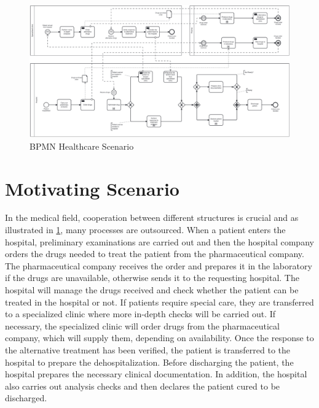 
\begin{figure}[t]
\centering
\includegraphics[width=10 cm]{content/figures/healthcare_scenario.pdf}
\caption{BPMN Healthcare Scenario}
\label{fig:BPMN_Healthcare}
\end{figure}
\section{Motivating Scenario}\label{sec:motivating}
In the medical field, cooperation between different structures is crucial and as illustrated in \cref{fig:BPMN_Healthcare}, many processes are outsourced. 
When a patient enters the hospital, preliminary examinations are carried out and then the hospital company orders the drugs needed to treat the patient from the pharmaceutical company. The pharmaceutical company receives the order and prepares it in the laboratory if the drugs are unavailable, otherwise sends it to the requesting hospital. The hospital will manage the drugs received and check whether the patient can be treated in the hospital or not. If patients require special care, they are transferred to a specialized clinic where more in-depth checks will be carried out. If necessary, the specialized clinic will order drugs from the pharmaceutical company, which will supply them, depending on availability. Once the response to the alternative treatment has been verified, the patient is transferred to the hospital to prepare the dehospitalization. Before discharging the patient, the hospital prepares the necessary clinical documentation. In addition, the hospital also carries out analysis checks and then declares the patient cured to be discharged.

